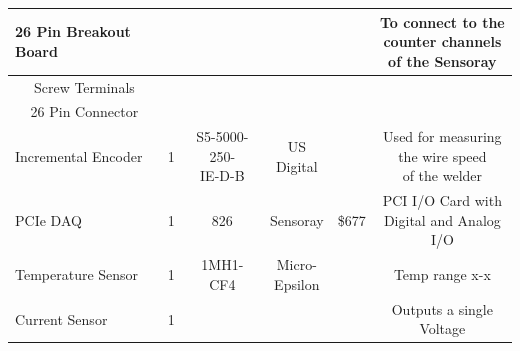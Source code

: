 \documentclass[12pt]{article}
\begin{document}
\begin{adjustwidth}{-2cm}{-2cm}
\begin{center}
\begin{tabular}{ |c|c|c|c|c|c| }
  
  \multicolumn{1}{|l|}{\textbf{26 Pin Breakout Board}} & & & & & \makecell{To connect to the \\ counter channels \\ of the Sensoray} \\ \hline  
  \multicolumn{1}{|c|}{Screw Terminals} & & & & & \\ \hline  
  \multicolumn{1}{|c|}{26 Pin Connector} & & & & & \\ \hline  
  	  
  	  
 \multicolumn{1}{|l|}{Incremental Encoder} & 1 & \makecell{S5-5000-250-\\IE-D-B} & \makecell{US \\ Digital} & & \makecell{Used for measuring \\ the wire speed \\ of the welder}   \\ \hline  

  
  \multicolumn{1}{|l|}{PCIe DAQ} & 1 & 826 & Sensoray & \$677 & \makecell{PCI I/O Card with \\ Digital and Analog I/O}   \\ \hline  
  
  \multicolumn{1}{|l|}{Temperature Sensor} & 1 & 1MH1-CF4 & \makecell{Micro-\\Epsilon} & & Temp range x-x    \\ \hline  
  
  \multicolumn{1}{|l|}{Current Sensor} & 1 & & & &  Outputs a single Voltage  \\ \hline
  
  
  
  
  
\end{tabular}

\end{center}




\clearpage

\end{adjustwidth}
\end{document}
